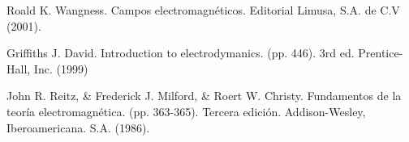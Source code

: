 
\begin{thebibliography}{50}\label{ch:bib}
 Roald K. Wangness. Campos electromagn\'eticos. Editorial Limusa, S.A. de C.V (2001).

 Griffiths J. David. Introduction to electrodymanics. (pp. 446). 3rd ed. Prentice-Hall, Inc. (1999)

 John R. Reitz, \& Frederick J. Milford, \& Roert W. Christy. Fundamentos de la teor\'ia electromagn\'etica. (pp. 363-365). Tercera edici\'on. Addison-Wesley, Iberoamericana. S.A. (1986).


\end{thebibliography}
